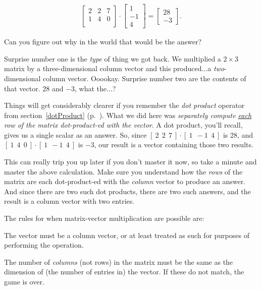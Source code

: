 \vspace{-.15in}
\begin{align*}
\begin{bmatrix}
2 & 2 & 7 \\
1 & 4 & 0 \\
\end{bmatrix} \cdot
\begin{bmatrix}
1 \\ -1 \\ 4 
\end{bmatrix} = 
\begin{bmatrix}
28 \\ -3
\end{bmatrix}.
\end{align*}

Can you figure out why in the world that would be the answer?

Surprise number one is the \textit{type} of thing we got back. We multiplied a
$2\times 3$ matrix by a three-dimensional column vector and this produced...a
\textit{two}-dimensional column vector. Ooookay. Surprise number two are the
contents of that vector. 28 and $-3$, what the...?

Things will get considerably clearer if you remember the \textit{dot product}
operator from section~\ref{dotProduct} (p.~\pageref{dotProduct}). What we did
here was \textit{separately compute \underline{each} row of the matrix
dot-product-ed with the vector}. A dot product, you'll recall, gives us a
single scalar as an answer. So, since $[\ 2\ \ 2\ \ 7\ ] \cdot [\ 1\ \ -1\ \ 4\
]$ is 28, and $[\ 1\ \ 4\ \ 0\ ] \cdot [\ 1\ \ -1\ \ 4\ ]$ is $-3$, our result
is a vector containing those two results.

This can really trip you up later if you don't master it now, so take a minute
and master the above calculation. Make sure you understand how the
\textit{rows} of the matrix are each dot-product-ed with the \textit{column}
vector to produce an answer. And since there are two such dot products, there
are two such answers, and the result is a column vector with two entries.

The rules for when matrix-vector multiplication are possible are:

\begin{compactenum}
\label{matVecRules}
\item The vector must be a column vector, or at least treated as such for
purposes of performing the operation.
\item The number of \textit{columns} (not rows) in the matrix must be the same
as the dimension of (the number of entries in) the vector. If these do not
match, the game is over.
\end{compactenum}


